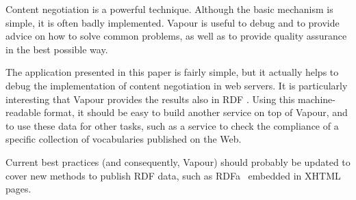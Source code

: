 \documentclass{../templates/llncs}
\begin{document}
Content negotiation is a powerful technique. Although the basic mechanism is simple,
it is often badly implemented. Vapour is useful to debug and to provide advice on how to solve common problems, as well as to provide quality 
assurance in the best possible way.


The application presented in this paper is fairly simple, but  
it actually helps to debug the implementation of content negotiation in web servers. It
is particularly interesting that Vapour provides the results also in RDF . Using this machine-readable 
format, it should be easy to build another service on top of Vapour, and to use these data for 
other tasks, such as a service to check the compliance of a specific collection 
of vocabularies published on the Web.

Current best practices (and consequently, Vapour) should probably be
updated to cover new methods to publish RDF data, such as
RDFa~\cite{Birbeck2006} embedded in XHTML pages.



\end{document}

